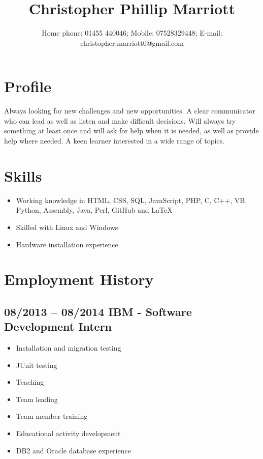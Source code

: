 \documentclass[0pt]{article}
\title{Christopher Phillip Marriott}
\date{Home phone: 01455  440046; Mobile: 07528329448; E-mail: christopher.marriott0@gmail.com}
\begin{document}
\maketitle
\thispagestyle{empty}
\pagestyle{empty}

\section*{Profile}
Always looking for new challenges and new opportunities. A clear communicator who can lead as well as listen and make difficult decisions. Will always try something at least once and will ask for help when it is needed, as well as provide help where needed.  A keen learner interested in a wide range of topics.


\section*{Skills}
\begin{itemize}
	\item Working knowledge in HTML, CSS, SQL, JavaScript, PHP, C, C++, VB, Python, Assembly, Java, Perl, GitHub and LaTeX 
	\item Skilled with Linux and Windows
	\item Hardware installation experience
\end{itemize}

\section*{Employment History}

\subsection*{08/2013 -- 08/2014   IBM - Software Development Intern}
\begin{itemize}
	\item Installation and migration testing
	\item JUnit testing 
	\item Teaching
	\item Team leading
	\item Team member training 
	\item Educational activity development
	\item DB2 and Oracle database experience
\end{itemize}
\end{document}
